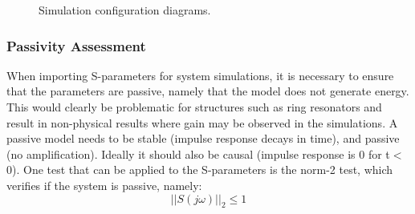 \documentclass[journal]{spie}
\begin{document}
\begin{figure}[htbp]
\begin{center}   
 \hspace{1cm} 
 \hspace{1cm}
\caption{Simulation configuration diagrams.  }
\label{figb}
\end{center}
\end{figure}


\subsubsection{Passivity Assessment}

When importing S-parameters for system simulations, it is necessary to ensure that the parameters are passive, namely that the model does not generate energy.  This would clearly be problematic for structures such as ring resonators and result in non-physical results where gain may be  observed in the simulations.  
A passive model needs to be stable (impulse response decays in time), and passive (no amplification).  Ideally it should also be causal (impulse response is 0 for t$<$0). 
One test that can be applied to the S-parameters is the norm-2 test, which verifies if the system is passive, namely:
\begin{equation}
	||S(j\omega)||_2 \le 1
\end{equation}
\end{document}
